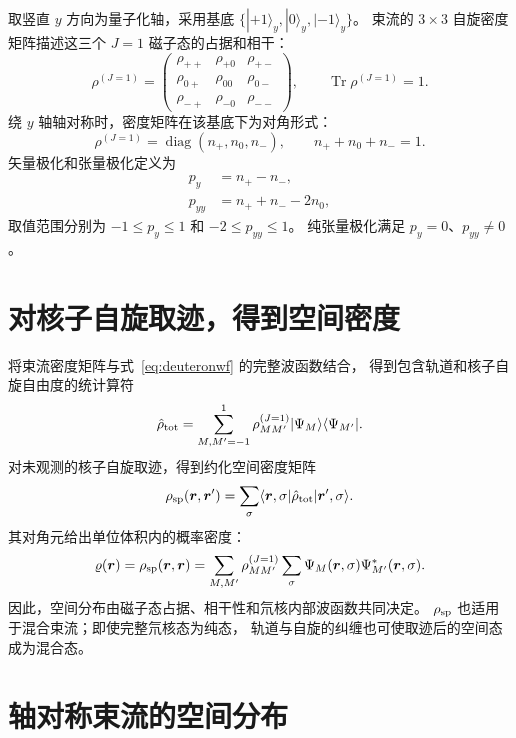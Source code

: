 \documentclass[11pt,a4paper]{ctexart}
\newcommand{\Tr}{\operatorname{Tr}}
\begin{document}
取竖直 $y$ 方向为量子化轴，采用基底
$\{|+1\rangle_y,|0\rangle_y,|-1\rangle_y\}$。
束流的 $3\times3$ 自旋密度矩阵描述这三个 $J=1$ 磁子态的占据和相干：
\begin{equation}
\rho^{(J=1)}
=
\begin{pmatrix}
\rho_{++} & \rho_{+0} & \rho_{+-}\\
\rho_{0+} & \rho_{00} & \rho_{0-}\\
\rho_{-+} & \rho_{-0} & \rho_{--}
\end{pmatrix},
\qquad
\Tr\rho^{(J=1)}=1.
\label{eq:spinrho}
\end{equation}
绕 $y$ 轴轴对称时，密度矩阵在该基底下为对角形式：
\begin{equation}
\rho^{(J=1)}=\operatorname{diag}(n_+,n_0,n_-),
\qquad n_++n_0+n_-=1.
\end{equation}
矢量极化和张量极化定义为
\begin{align}
p_y &= n_+-n_-,\\
p_{yy} &= n_++n_--2n_0,
\label{eq:polarization}
\end{align}
取值范围分别为 $-1\le p_y\le1$ 和 $-2\le p_{yy}\le1$。
纯张量极化满足 $p_y=0$、$p_{yy}\ne0$。

\section{对核子自旋取迹，得到空间密度}

将束流密度矩阵与式~\eqref{eq:deuteronwf} 的完整波函数结合，
得到包含轨道和核子自旋自由度的统计算符
\begin{equation}
\hat\rho_{\rm tot}
=
\sum_{M,M'=-1}^{1}
\rho_{MM'}^{(J=1)}|\Psi_M\rangle\langle\Psi_{M'}|.
\label{eq:fullrho}
\end{equation}
对未观测的核子自旋取迹，得到约化空间密度矩阵
\begin{equation}
\rho_{\rm sp}(\bm r,\bm r')
=
\sum_\sigma
\langle\bm r,\sigma|\hat\rho_{\rm tot}|\bm r',\sigma\rangle.
\label{eq:reduced}
\end{equation}
其对角元给出单位体积内的概率密度：
\begin{equation}
\varrho(\bm r)
=
\rho_{\rm sp}(\bm r,\bm r)
=
\sum_{M,M'}\rho_{MM'}^{(J=1)}
\sum_\sigma\Psi_M(\bm r,\sigma)\Psi_{M'}^*(\bm r,\sigma).
\label{eq:localdensity}
\end{equation}
因此，空间分布由磁子态占据、相干性和氘核内部波函数共同决定。
$\rho_{\rm sp}$ 也适用于混合束流；即使完整氘核态为纯态，
轨道与自旋的纠缠也可使取迹后的空间态成为混合态。

\section{轴对称束流的空间分布}
\end{document}
